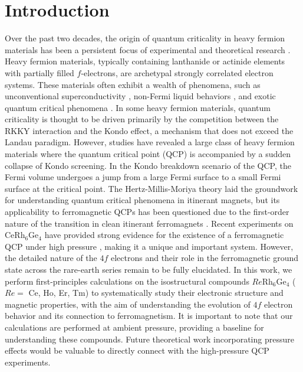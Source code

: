 \documentclass[preprint,12pt]{elsarticle}
\begin{document}
\section{Introduction}
Over the past two decades, the origin of quantum criticality in heavy fermion materials has been a persistent focus of experimental and theoretical research \cite{si2010heavy, custers2003breakup, lohneysen1994non}. Heavy fermion materials, typically containing lanthanide or actinide elements with partially filled $f$-electrons, are archetypal strongly correlated electron systems. These materials often exhibit a wealth of phenomena, such as unconventional superconductivity \cite{ran2019nearly, jiao2020chiral, li2021research, lin2020heavy}, non-Fermi liquid behaviors \cite{legros2019universal, trovarelli2000pronounced, daou2008linear, stewart2001non, lohneysen1994non}, and exotic quantum critical phenomena \cite{si2010heavy, liu2023quantum, custers2003breakup}. In some heavy fermion materials, quantum criticality is thought to be driven primarily by the competition between the RKKY interaction and the Kondo effect, a mechanism that does not exceed the Landau paradigm. However, studies have revealed a large class of heavy fermion materials where the quantum critical point (QCP) is accompanied by a sudden collapse of Kondo screening. In the Kondo breakdown scenario of the QCP, the Fermi volume undergoes a jump from a large Fermi surface to a small Fermi surface at the critical point. The Hertz-Millis-Moriya theory \cite{hertz1976quantum, millis1993effect, moriya1985spin} laid the groundwork for understanding quantum critical phenomena in itinerant magnets, but its applicability to ferromagnetic QCPs has been questioned due to the first-order nature of the transition in clean itinerant ferromagnets \cite{belitz1999first, chubukov2004instability}. Recent experiments on CeRh$_6$Ge$_4$ have provided strong evidence for the existence of a ferromagnetic QCP under high pressure \cite{shen2020strange}, making it a unique and important system. However, the detailed nature of the $4f$ electrons and their role in the ferromagnetic ground state across the rare-earth series remain to be fully elucidated. In this work, we perform first-principles calculations on the isostructural compounds $Re$Rh$_6$Ge$_4$ ($Re =$ Ce, Ho, Er, Tm) to systematically study their electronic structure and magnetic properties, with the aim of understanding the evolution of $4f$ electron behavior and its connection to ferromagnetism. It is important to note that our calculations are performed at ambient pressure, providing a baseline for understanding these compounds. Future theoretical work incorporating pressure effects would be valuable to directly connect with the high-pressure QCP experiments.
\end{document}
